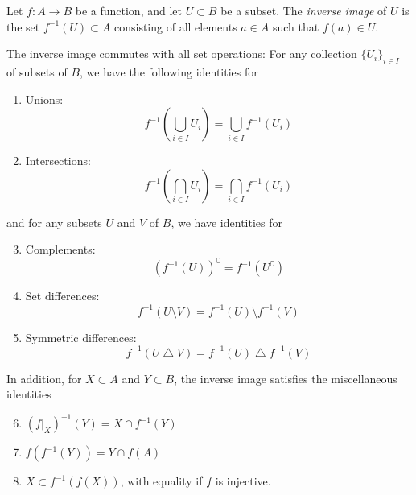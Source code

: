 \documentclass{article}
\begin{document}
Let $f: A \longrightarrow B$ be a function, and let $U \subset B$ be a subset. The  {\em inverse image} of $U$ is the set $f^{-1}(U) \subset A$ consisting of all elements $a \in A$ such that $f(a) \in U$.

The inverse image commutes with all set operations: For any collection $\{U_i\}_{i \in I}$ of subsets of $B$, we have the following identities for
\begin{enumerate}
\item Unions:
$$f^{-1}\left(\bigcup_{i \in I} U_i\right) = \bigcup_{i \in I} f^{-1}(U_i)$$
\item Intersections:
$$f^{-1}\left(\bigcap_{i \in I} U_i\right) = \bigcap_{i \in I} f^{-1}(U_i)$$
\end{enumerate}
and for any subsets $U$ and $V$ of $B$, we have identities for
\begin{enumerate}
\setcounter{enumi}{2}
\item Complements:
$$\left(f^{-1}(U)\right)^\complement = f^{-1}(U^\complement)$$
\item Set differences:
$$f^{-1}(U \setminus V) = f^{-1}(U) \setminus f^{-1}(V)$$
\item Symmetric differences:
$$f^{-1}(U \bigtriangleup V) = f^{-1}(U) \bigtriangleup f^{-1}(V)$$
\end{enumerate}
In addition, for $X \subset A$ and $Y \subset B$, the inverse image satisfies the miscellaneous identities
\begin{enumerate}
\setcounter{enumi}{5}
\item $(f|_X)^{-1}(Y)=X\cap f^{-1}(Y)$
\item $f\left(f^{-1}(Y)\right) = Y\cap f(A)$
\item $X \subset f^{-1}(f(X))$, with equality if $f$ is injective.
\end{enumerate}
\end{document}
